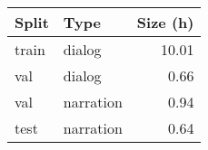 \begin{tabular}{llr}
\toprule
Split &      Type &  Size (h) \\
\midrule
train &    dialog &     10.01 \\
  val &    dialog &      0.66 \\
  val & narration &      0.94 \\
 test & narration &      0.64 \\
\bottomrule
\end{tabular}
